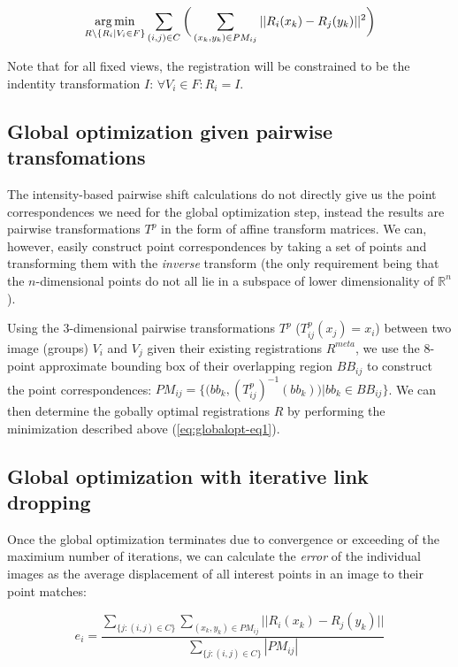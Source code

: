 \begin{equation}
\label{eq:globalopt-eq1}
\operatorname*{arg\,min}_{R \setminus \{R_i | V_i \in F\}} \sum_{(i,j) \in C} \bigg( \sum_{(x_{k}, y_{k}) \in PM_{ij}} || R_{i}( x_{k}) - R_{j}( y_{k}) ||^2 \bigg)
\end{equation}

Note that for all fixed views, the registration will be constrained to be the indentity transformation $I$: $\forall V_i \in F: R_{i} = I$.

\subsection*{Global optimization given pairwise transfomations}

The intensity-based pairwise shift calculations do not directly give us the point correspondences we need for the global optimization step, instead the results are pairwise transformations $T^{p}$ in the form of affine transform matrices. We can, however, easily construct point correspondences by taking a set of points and transforming them with the \emph{inverse} transform (the only requirement being that the $n$-dimensional points do not all lie in a subspace of lower dimensionality of $\mathbb{R}^n$).  

Using the 3-dimensional pairwise transformations $T^{p}$ ($T^p_{ij} (x_{j}) = x_i$) between two image (groups) $V_i$ and $V_j$ given their existing registrations $R^{meta}$, we use the 8-point approximate bounding box of their overlapping region $BB_{ij}$ to construct the point correspondences: $PM_{ij} = \{ \big(bb_k, (T^p_{ij})^{-1}(bb_k) \big) | bb_k \in BB_{ij}\}$. We can then determine the gobally optimal registrations $R$ by performing the minimization described above (\ref{eq:globalopt-eq1}).  

\subsection*{Global optimization with iterative link dropping}

Once the global optimization terminates due to convergence or exceeding of the maximium number of iterations, we can calculate the \emph{error} of the individual images as the average displacement of all interest points in an image to their point matches:

\begin{equation}
\label{eq:gloablopt-eq2}
e_i = \frac{\sum_{\{j: (i,j) \in C\}}  \sum_{(x_{k}, y_{k}) \in PM_{ij}} || R_{i}( x_{k}) - R_{j}( y_{k}) ||  }{ \sum_{\{j: (i,j) \in C\}} |PM_{ij}| }
\end{equation}

